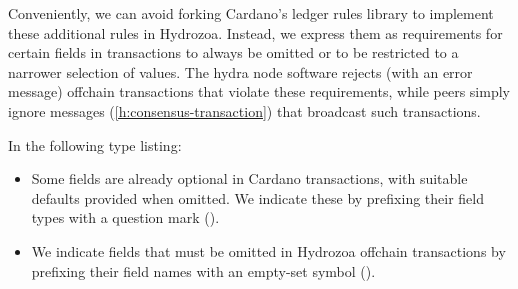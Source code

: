 \documentclass[../hydrozoa.tex]{subfiles}
\begin{document}
Conveniently, we can avoid forking Cardano's ledger rules library to implement these additional rules in Hydrozoa.
Instead, we express them as requirements for certain fields in transactions to always be omitted or to be restricted to a narrower selection of values.
The hydra node software rejects (with an error message) offchain transactions that violate these requirements, while peers simply ignore  messages (\cref{h:consensus-transaction}) that broadcast such transactions.

In the following type listing:
\begin{itemize}
  \item Some fields are already optional in Cardano transactions, with suitable defaults provided when omitted. We indicate these by prefixing their field types with a question mark ().
  \item We indicate fields that must be omitted in Hydrozoa offchain transactions by prefixing their field names with an empty-set symbol (\code{$\varnothing$}).
\end{itemize}
\begingroup
\allowdisplaybreaks
\end{document}
